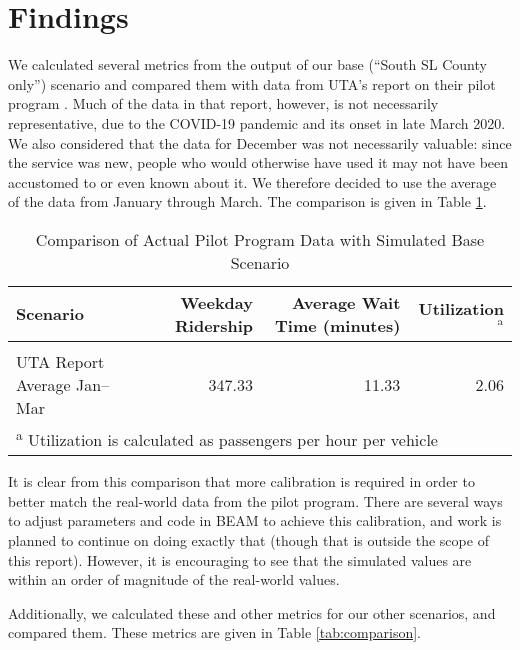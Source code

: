 \documentclass[3p, authoryear]{elsarticle} %
\begin{document}
\hypertarget{findings}{%
\section{Findings}\label{findings}}

We calculated several metrics from the output of our base (``South SL County only'') scenario and compared them with data from UTA's report on their pilot program \citep{UTAevalQ1, UTAevalQ2, UTAevalQ3, UTAevalQ4}. Much of the data in that report, however, is not necessarily representative, due to the COVID-19 pandemic and its onset in late March 2020. We also considered that the data for December was not necessarily valuable: since the service was new, people who would otherwise have used it may not have been accustomed to or even known about it. We therefore decided to use the average of the data from January through March. The comparison is given in Table \ref{tab:UTAComparison}.

\begin{table}[H]

\caption{\label{tab:UTAComparison}Comparison of Actual Pilot Program Data with Simulated Base Scenario}
\centering
\begin{tabular}[t]{lrrr}
\toprule
Scenario & Weekday Ridership & Average Wait Time (minutes) & Utilization$^{\text{a}}$\\
\midrule
\cellcolor{gray!6}{South SL County only} & \cellcolor{gray!6}{1006.00} & \cellcolor{gray!6}{5.82} & \cellcolor{gray!6}{4.14}\\
UTA Report Average Jan--Mar & 347.33 & 11.33 & 2.06\\
\bottomrule
\multicolumn{4}{l}{\textsuperscript{a} Utilization is calculated as passengers per hour per vehicle}\\
\end{tabular}
\end{table}

It is clear from this comparison that more calibration is required in order to better match the real-world data from the pilot program. There are several ways to adjust parameters and code in BEAM to achieve this calibration, and work is planned to continue on doing exactly that (though that is outside the scope of this report). However, it is encouraging to see that the simulated values are within an order of magnitude of the real-world values.

Additionally, we calculated these and other metrics for our other scenarios, and compared them. These metrics are given in Table \ref{tab:comparison}.
\end{document}
